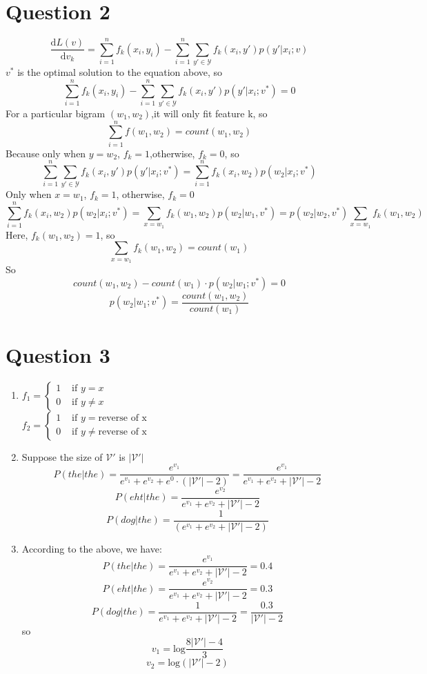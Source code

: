 \documentclass[12pt]{article}
\begin{document}
\section*{Question 2}
$$\frac{\mathrm{d} L(v)}{\mathrm{d} v_k}=\sum _{i=1}^nf_k(x_i,y_i)-\sum_{i=1}^{n}\sum_{y'\in \mathcal Y}f_k(x_i,y')p(y'|x_i;v)$$
$v^*$ is the optimal solution to the equation above, so\\
$$\sum _{i=1}^nf_k(x_i,y_i)-\sum_{i=1}^{n}\sum_{y'\in \mathcal Y}f_k(x_i,y')p(y'|x_i;v^*)=0$$
For a particular bigram $(w_1,w_2)$,it will only fit feature k, so
$$\sum _{i=1}^nf(w_1,w_2)=count(w_1,w_2)$$
Because only when $y=w_2$, $f_k=1$,otherwise, $f_k=0$, so \\
$$\sum_{i=1}^{n}\sum_{y'\in \mathcal Y}f_k(x_i,y')p(y'|x_i;v^*)=\sum_{i=1}^{n}f_k(x_i,w_2)p(w_2|x_i;v^*)$$
Only when $x=w_1$, $f_k=1$, otherwise, $f_k=0$\\
$$\sum_{i=1}^{n}f_k(x_i,w_2)p(w_2|x_i;v^*)=\sum_{x=w_1}f_k(w_1,w_2)p(w_2|w_1,v^*)=p(w_2|w_2,v^*)\sum_{x=w_1}f_k(w_1,w_2)$$
Here, $f_k(w_1,w_2)=1$, so \\
$$\sum_{x=w_1}f_k(w_1,w_2)=count(w_1)$$
So\\
$$count(w_1,w_2)-count(w_1)\cdot p(w_2|w_1;v^*)=0$$
$$p(w_2|w_1;v^*)=\frac{count(w_1,w_2)}{count(w_1)}$$


\section*{Question 3}
\begin{enumerate}
	\item 
	$f_1=\begin{cases}
		1 & \text{ if } y=x \\ 
		0 & \text{ if } y\neq x 
	\end{cases}$\\
	$ f_2=\begin{cases}
	1 & \text{ if } y=\text{reverse of x} \\ 
	0 & \text{ if } y\neq \text{reverse of x}
	\end{cases}$
	
	\item 
	Suppose the size of $\mathcal {V'}$ is $|\mathcal {V'}|$\\
	$$P (the|the)=\frac{e^{v_1}}{e^{v_1}+e^{v_2}+e^0\cdot (|\mathcal{V'}|-2)}=\frac{e^{v_1}}{e^{v_1}+e^{v_2}+|\mathcal{V'}|-2}$$
	$$P (eht|the)=\frac{e^{v_2}}{e^{v_1}+e^{v_2}+|\mathcal{V'}|-2}$$
	$$P (dog|the)=\frac{1}{(e^{v_1}+e^{v_2}+|\mathcal{V'}|-2)}$$
	
	\item
	According to the above, we have:
	$$P (the|the)=\frac{e^{v_1}}{e^{v_1}+e^{v_2}+|\mathcal{V'}|-2}=0.4$$
	$$P (eht|the)=\frac{e^{v_2}}{e^{v_1}+e^{v_2}+|\mathcal{V'}|-2}=0.3$$
	$$P (dog|the)=\frac{1}{e^{v_1}+e^{v_2}+|\mathcal{V'}|-2}=\frac{0.3}{|\mathcal{V'}|-2}$$
	so
	$$v_1=\text{log}\frac{8|\mathcal{V'}|-4}{3}$$
	$$v_2=\text{log}(|\mathcal{V'}|-2)$$
\end{enumerate}







\end{document}
